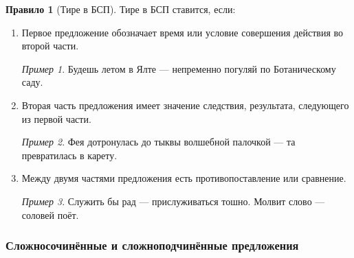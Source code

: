 \documentclass[12pt]{article}
\theoremstyle{definition}
\newtheorem{rrule}{Правило}[section]
\theoremstyle{remark}
\newtheorem*{example}{Пример}
\begin{document}
\begin{rrule}[Тире в БСП]
    Тире в БСП ставится, если:
    \begin{enumerate}
        \item Первое предложение обозначает время или условие совершения действия во второй части.
        \begin{example}
            Будешь летом в Ялте — непременно погуляй по Ботаническому саду.
        \end{example}
        \item Вторая часть предложения имеет значение следствия, результата, следующего из первой части.
        \begin{example}
            Фея дотронулась до тыквы волшебной палочкой — та превратилась в карету.
        \end{example}
        \item Между двумя частями предложения есть противопоставление или сравнение.
        \begin{example}
            Служить бы рад — прислуживаться тошно. Молвит слово — соловей поёт.
        \end{example}
    \end{enumerate}
\end{rrule}

\subsubsection{Сложносочинённые и сложноподчинённые предложения}
\end{document}
